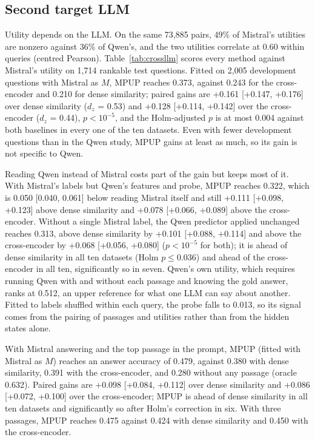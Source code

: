 \documentclass[conference]{IEEEtran}
\begin{document}
\subsection{Second target LLM}\label{sec:crossllm}
Utility depends on the LLM. On the same 73,885 pairs, 49\% of Mistral's utilities are nonzero against 36\% of Qwen's, and the two utilities correlate at 0.60 within queries (centred Pearson). Table~\ref{tab:crossllm} scores every method against Mistral's utility on 1,714 rankable test questions. Fitted on 2,005 development questions with Mistral as $M$, MPUP reaches 0.373, against 0.243 for the cross-encoder and 0.210 for dense similarity; paired gains are +0.161 [+0.147, +0.176] over dense similarity ($d_z$ = 0.53) and +0.128 [+0.114, +0.142] over the cross-encoder ($d_z$ = 0.44), $p < 10^{-5}$, and the Holm-adjusted $p$ is at most 0.004 against both baselines in every one of the ten datasets. Even with fewer development questions than in the Qwen study, MPUP gains at least as much, so its gain is not specific to Qwen.

Reading Qwen instead of Mistral costs part of the gain but keeps most of it. With Mistral's labels but Qwen's features and probe, MPUP reaches 0.322, which is 0.050 [0.040, 0.061] below reading Mistral itself and still +0.111 [+0.098, +0.123] above dense similarity and +0.078 [+0.066, +0.089] above the cross-encoder. Without a single Mistral label, the Qwen predictor applied unchanged reaches 0.313, above dense similarity by +0.101 [+0.088, +0.114] and above the cross-encoder by +0.068 [+0.056, +0.080] ($p < 10^{-5}$ for both); it is ahead of dense similarity in all ten datasets (Holm $p \le 0.036$) and ahead of the cross-encoder in all ten, significantly so in seven. Qwen's own utility, which requires running Qwen with and without each passage and knowing the gold answer, ranks at 0.512, an upper reference for what one LLM can say about another. Fitted to labels shuffled within each query, the probe falls to 0.013, so its signal comes from the pairing of passages and utilities rather than from the hidden states alone.

With Mistral answering and the top passage in the prompt, MPUP (fitted with Mistral as $M$) reaches an answer accuracy of 0.479, against 0.380 with dense similarity, 0.391 with the cross-encoder, and 0.280 without any passage (oracle 0.632). Paired gains are +0.098 [+0.084, +0.112] over dense similarity and +0.086 [+0.072, +0.100] over the cross-encoder; MPUP is ahead of dense similarity in all ten datasets and significantly so after Holm's correction in six. With three passages, MPUP reaches 0.475 against 0.424 with dense similarity and 0.450 with the cross-encoder.
\end{document}
